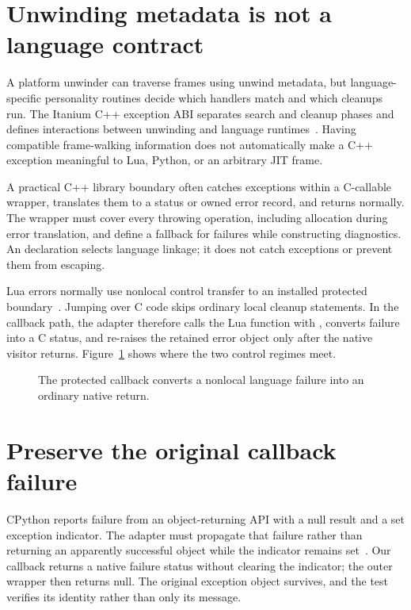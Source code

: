 \section{Unwinding metadata is not a language contract}
\label{sec:ch74-unwind}
A platform unwinder can traverse frames using unwind metadata, but language-specific personality routines decide which handlers match and which cleanups run.
The Itanium C++ exception ABI separates search and cleanup phases and defines interactions between unwinding and language runtimes~\cite{itanium-2026-exceptions}.
Having compatible frame-walking information does not automatically make a C++ exception meaningful to Lua, Python, or an arbitrary JIT frame.

A practical C++ library boundary often catches exceptions within a C-callable wrapper, translates them to a status or owned error record, and returns normally.
The wrapper must cover every throwing operation, including allocation during error translation, and define a fallback for failures while constructing diagnostics.
An  declaration selects language linkage; it does not catch exceptions or prevent them from escaping.

Lua errors normally use nonlocal control transfer to an installed protected boundary~\cite{ierusalimschy-2026-lua}.
Jumping over C code skips ordinary local cleanup statements.
In the callback path, the adapter therefore calls the Lua function with , converts failure into a C status, and re-raises the retained error object only after the native visitor returns.
Figure~\ref{fig:ch74-boundary} shows where the two control regimes meet.

\begin{figure}[htbp]
\centering
{}
\caption{The protected callback converts a nonlocal language failure into an ordinary native return.}
\label{fig:ch74-boundary}
\end{figure}

\section{Preserve the original callback failure}
\label{sec:ch74-preserve}
CPython reports failure from an object-returning API with a null result and a set exception indicator.
The adapter must propagate that failure rather than returning an apparently successful object while the indicator remains set~\cite{python-2026-capi}.
Our callback returns a native failure status without clearing the indicator; the outer wrapper then returns null.
The original exception object survives, and the test verifies its identity rather than only its message.

